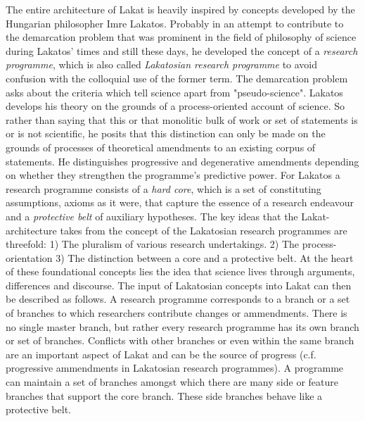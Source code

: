 

The entire architecture of Lakat is heavily inspired by concepts developed by the Hungarian philosopher Imre Lakatos. Probably in an attempt to contribute to the demarcation problem that was prominent in the field of philosophy of science during Lakatos' times and still these days, he developed the concept of a \textit{research programme}, which is also called \textit{Lakatosian research programme} to avoid confusion with the colloquial use of the former term. The demarcation problem asks about the criteria which tell science apart from "pseudo-science".  Lakatos develops his theory on the grounds of a process-oriented account of science. So rather than saying that this or that monolitic bulk of work or set of statements is or is not scientific, he posits that this distinction can only be made on the grounds of processes of theoretical amendments to an existing corpus of statements. He distinguishes progressive and degenerative amendments depending on whether they strengthen the programme's predictive power. For Lakatos a research programme consists of a \textit{hard core}, which is a set of constituting assumptions, axioms as it were, that capture the essence of a research endeavour and a \textit{protective belt} of auxiliary hypotheses. The key ideas that the Lakat-architecture takes from the concept of the Lakatosian research programmes are threefold: 1) The pluralism of various research undertakings. 2) The process-orientation 3) The distinction between a core and a protective belt. At the heart of these foundational concepts lies the idea that science lives through arguments, differences and discourse. The input of Lakatosian concepts into Lakat can then be described as follows. A research programme corresponds to a branch or a set of branches to which researchers contribute changes or ammendments. There is no single master branch, but rather every research programme has its own branch or set of branches. Conflicts with other branches or even within the same branch are an important aspect of Lakat and can be the source of progress (c.f. progressive ammendments in Lakatosian research programmes). A programme can maintain a set of branches amongst which there are many side or feature branches that support the core branch. These side branches behave like a protective belt.  
% 
% 
